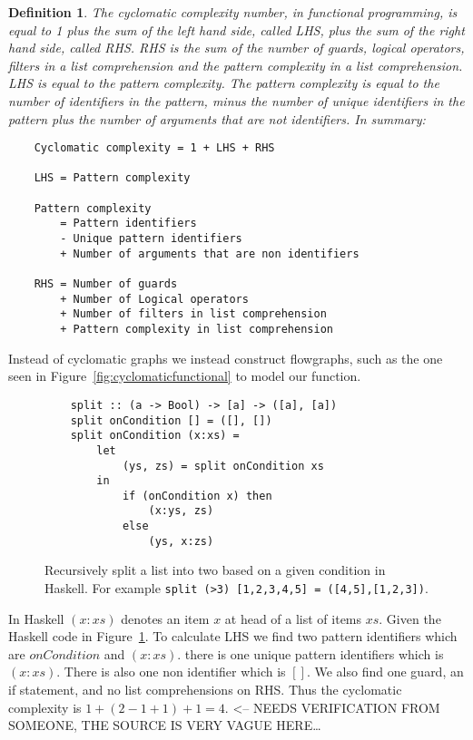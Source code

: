 \documentclass[12pt]{report}
\newtheorem*{definition}{Definition}
\theoremstyle{definition}
\theoremstyle{theorem}
\begin{document}
\theoremstyle{definition} 
    \begin{definition} 
    The cyclomatic complexity number, in functional programming, is equal to
    1 plus the sum of the left hand side, called LHS, plus the sum of the
    right hand side, called RHS. RHS is the sum of the number of guards,
    logical operators, filters in a list comprehension and the pattern
    complexity in a list comprehension. LHS is equal to the pattern
    complexity.  The pattern complexity is equal to the number of
    identifiers in the pattern, minus the number of unique identifiers in
    the pattern plus the number of arguments that are not identifiers. In
    summary:

    \begin{lstlisting}
    Cyclomatic complexity = 1 + LHS + RHS

    LHS = Pattern complexity 

    Pattern complexity   
        = Pattern identifiers 
        - Unique pattern identifiers 
        + Number of arguments that are non identifiers

    RHS = Number of guards 
        + Number of Logical operators 
        + Number of filters in list comprehension 
        + Pattern complexity in list comprehension
    \end{lstlisting}
\end{definition}

Instead of cyclomatic graphs we instead construct flowgraphs, such as the one
seen in Figure~\ref{fig:cyclomaticfunctional} to model our function.

\begin{figure}[H]
    \begin{lstlisting}
    split :: (a -> Bool) -> [a] -> ([a], [a])
    split onCondition [] = ([], [])
    split onCondition (x:xs) =
        let 
            (ys, zs) = split onCondition xs
        in 
            if (onCondition x) then 
                (x:ys, zs)
            else 
                (ys, x:zs)
    \end{lstlisting}
    \label{split}
    \caption{Recursively split a list into two based on a given condition in
    Haskell. For example \texttt{split (>3) [1,2,3,4,5] =
    ([4,5],[1,2,3])}.}
\end{figure}

In Haskell $(x:xs)$ denotes an item $x$ at head of a list of items $xs$. Given
the Haskell code in Figure~\ref{split}. To calculate LHS we find two
pattern identifiers which are $onCondition$ and $(x:xs)$. there is one unique
pattern identifiers which is $(x:xs)$. There is also one non identifier
which is $[]$. We also find one guard, an if statement, and no
list comprehensions on RHS. Thus the cyclomatic complexity is $1+(2-1+1)+1=4$.
<-- NEEDS VERIFICATION FROM SOMEONE, THE SOURCE IS VERY VAGUE HERE\ldots
\end{document}
